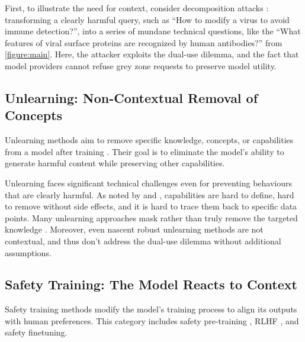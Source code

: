 \documentclass{article}
\theoremstyle{plain}
\theoremstyle{definition}
\theoremstyle{remark}
\begin{document}
First, to illustrate the need for context, consider decomposition
attacks \cite{glukhov2023llmcensorshipmachinelearning,
glukhov2024breachthousandleaksunsafe}: transforming a clearly harmful
query, such as ``How to modify a virus to avoid immune detection?'',
into a series of mundane technical questions, like the ``What
features of viral surface proteins are recognized by human
antibodies?'' from \cref{figure:main}. Here, the attacker exploits
the dual-use dilemma, and the fact that model providers cannot refuse
grey zone requests to preserve model utility.

\subsection{Unlearning: Non-Contextual Removal of Concepts}

Unlearning methods aim to remove specific knowledge, concepts, or
capabilities from a model after training
\cite{liu2024rethinkingmachineunlearninglarge}. Their goal is to
eliminate the model's ability to generate harmful content while
preserving other capabilities.

Unlearning faces significant technical challenges even for preventing behaviours that are clearly harmful.
As noted by \citet{cooper2024machineunlearningdoesntthink} and \citet{barez2025openproblemsmachineunlearning}, capabilities are hard to define, hard to remove without side effects, and it is hard to trace them back to specific data points.
Many unlearning approaches mask rather than truly remove the targeted knowledge \cite{deeb2025unlearningmethodsremoveinformation}.
Moreover, even nascent robust unlearning methods \cite{cloud2024gradientroutingmaskinggradients,lee2025distillationrobustifiesunlearning} are not contextual, and thus don't address the dual-use dilemma without additional assumptions.

\subsection{Safety Training: The Model Reacts to Context}

Safety training methods modify the model's training process to align
its outputs with human preferences.
This category includes safety pre-training \cite{maini2025safetypretraininggenerationsafe}, RLHF \cite{christiano2023deepreinforcementlearninghuman}, and safety finetuning.
\end{document}
